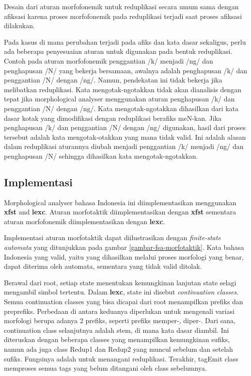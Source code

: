 Desain dari aturan morfofonemik untuk reduplikasi secara umum sama dengan afiksasi karena proses morfofonemik pada reduplikasi terjadi saat proses afiksasi dilakukan.

Pada kasus di mana perubahan terjadi pada afiks dan kata dasar sekaligus, perlu ada beberapa penyesuaian aturan untuk digunakan pada bentuk reduplikasi. Contoh pada aturan morfofonemik penggantian /k/ menjadi /ng/ dan penghapusan /N/ yang bekerja bersamaan, awalnya adalah penghapusan /k/ dan penggantian /N/ dengan /ng/. Namun, pendekatan ini tidak bekerja jika melibatkan reduplikasi. Kata mengotak-ngotakkan tidak akan dianalisis dengan tepat jika morphological analyser menggunakan aturan penghapusan /k/ dan penggantian /N/ dengan /ng/. Kata mengotak-ngotakkan dihasilkan dari kata dasar kotak yang dimodifikasi dengan reduplikasi berafiks meN-kan. Jika penghapusan /k/ dan penggantian /N/ dengan /ng/ digunakan, hasil dari proses tersebut adalah kata mengotak-otakkan yang mana tidak valid. Ini adalah alasan dalam reduplikasi aturannya diubah menjadi penggantian /k/ menjadi /ng/ dan penghapusan /N/ sehingga dihasilkan kata mengotak-ngotakkan.

\subsection{Implementasi}
\label{sec:implementasiMPYangSudahAda}

Morphological analyser bahasa Indonesia ini diimplementasikan menggunakan \textbf{xfst} and \textbf{lexc}. Aturan morfotaktik diimplementasikan dengan \textbf{xfst} sementara aturan morfofonemik diimplementasikan dengan \textbf{lexc}.

Implementasi aturan morfotaktik dapat diilustrasikan dengan \textit{finite-state automata} yang ditunjukkan pada gambar \ref{gambar-fsa-morfotaktik}. Kata bahasa Indonesia yang valid, yaitu yang dihasilkan melalui proses morfologi yang benar, dapat diterima oleh automata, sementara yang tidak valid ditolak.

Berawal dari root, setiap state menentukan kemungkinan lanjutan state selagi mengambil simbol tertentu. Dalam \textbf{lexc}, state ini disebut \textit{continuation classes}. Semua continuation classes yang bisa dicapai dari root menampilkan prefiks dan preprefiks. Perbedaan di antara keduanya diperlukan untuk mengenali variasi morfologi berupa adanya 2 prefiks, seperti prefiks memper-, diper-. Dari sana, continuation class selanjutnya adalah stem, di mana kata dasar diambil. Ini diteruskan dengan beberapa classes yang menampilkan kemungkinan sufiks, namun ada juga class Redup1 dan Redup2 yang muncul sebelum dan setelah sufiks. Fungsinya adalah untuk menangani reduplikasi. Terakhir, tagEmit class memproses semua tags yang belum ditangani oleh class sebelumnya.

